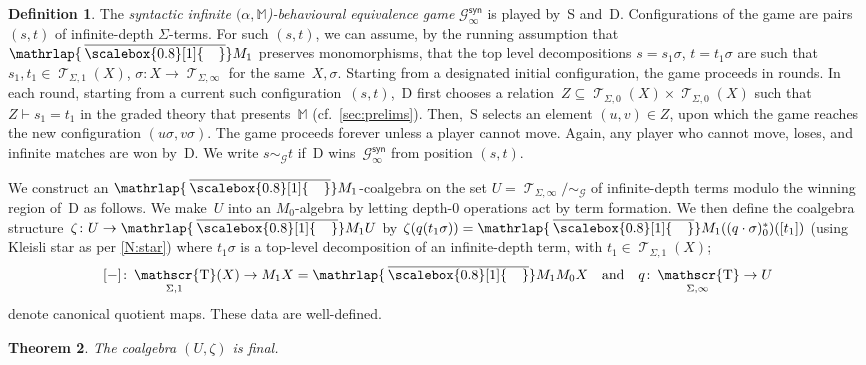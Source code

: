 \documentclass[sigconf,
			final%
			nonacm
                        ]{acmart}
\numberwithin{equation}{section}
\numberwithin{equation}{section}
\theoremstyle{plain}
\newtheorem{thm}{Theorem}[section]
\theoremstyle{definition}
\newtheorem{defn}[thm]{Definition}
\newcommand{\mybar}[3]{%
  \mathrlap{\hspace{#2}\overline{\scalebox{#1}[1]{\hphantom{\ensuremath{#3}}\vphantom{\rule{0pt}{5.5pt}}}}}\ensuremath{#3}
}
\newcommand{\infgameeq}{\sim_{\mathcal{G}}}
\newcommand{\barM}{\mybar{0.8}{2pt}{M}_1}
\newcommand{\syn}{\mathsf{syn}}
\newcommand{\M}{\mathbb{M}}                   %
\DeclareMathOperator{\Terms}{\mathscr{T}}
\newcommand{\Termsarg}[1]{\Terms_{\!#1}}
\newcommand{\CalG}{\mathcal{G}}             %
\begin{document}
\begin{defn}
  The \emph{syntactic infinite $(\alpha,\M$)-behavioural equivalence
    game} $\CalG^\syn_\infty$ is played by~S and~D. Configurations of
  the game are pairs $(s,t)$ of infinite-depth $\Sigma$-terms. For
  such $(s,t)$, we can assume, by the running assumption that~$\barM$
  preserves monomorphisms, that the top level decompositions
  $s=s_1\sigma$, $t=t_1\sigma$ are such that
  $s_1,t_1\in\Termsarg{\Sigma,1}(X)$,
  $\sigma\colon X\to\Termsarg{\Sigma,\infty}$ for the
  same~$X,\sigma$. Starting from a designated initial configuration,
  the game proceeds in rounds. In each round, starting from a current
  such configuration~$(s,t)$,~D first chooses a
  relation~$Z\subseteq\Termsarg{\Sigma,0}(X)\times\Termsarg{\Sigma,0}(X)$
  such that $Z\vdash s_1 = t_1$ in the graded theory that
  presents~$\M$ (cf.~\cref{sec:prelims}). \mbox{Then, S} selects an
  element $(u,v)\in Z$, upon which the game reaches the new
  configuration $(u\sigma,v\sigma)$. The game proceeds forever unless
  a player cannot move. Again, any player who cannot move, loses, and
  infinite matches are won by~D. We write $s\infgameeq t$ if~D
  wins~$\CalG^\syn_\infty$ from position $(s,t)$.
\end{defn}
\noindent We construct an $\barM$-coalgebra on the set
\(
U=\Termsarg{\Sigma,\infty}/{\infgameeq}
\)
of infinite-depth terms modulo the winning region of~D as follows. We
make~$U$ into an $M_0$-algebra by letting depth-0 operations act by
term formation. We then define the coalgebra
structure~$\zeta\colon U \to \barM U$ by
\(
  \zeta(q(t_1\sigma)) = \barM((q\cdot\sigma)^*_0)([t_1])
\)
(using Kleisli star as per \cref{N:star}) where
$t_1\sigma$ is a top-level decomposition of an infinite-depth term,
with $t_1\in\Termsarg{\Sigma,1}(X)$;
\[
  [-]\colon  \Termsarg{\Sigma,1}(X)\to M_1X=\barM M_0 X
  \quad\text{and}\quad
  q\colon \Termsarg{\Sigma,\infty}\to U
\]
denote canonical quotient maps.
These data are well-defined.%
%
\begin{thm}\label{thm:fin-coalg}
  The coalgebra $(U,\zeta)$ is final.%
\end{thm}
\end{document}
